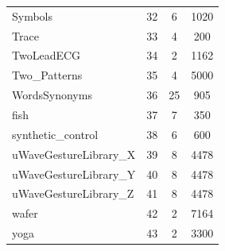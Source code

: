 \documentclass[10pt,journal,compsoc]{IEEEtran}
\begin{document}
\begin{table} [h!]
\begin{center}
\begin{tabular}{lccc}
Symbols & 32 &  6 & 1020 \\ 
Trace & 33 &  4 &  200 \\ 
TwoLeadECG & 34 &  2 & 1162 \\ 
Two\_Patterns & 35 &  4 & 5000 \\ 
WordsSynonyms & 36 & 25 &  905 \\ 
fish & 37 &  7 &  350 \\ 
synthetic\_control & 38 &  6 &  600 \\ 
uWaveGestureLibrary\_X & 39 &  8 & 4478 \\ 
uWaveGestureLibrary\_Y & 40 &  8 & 4478 \\ 
uWaveGestureLibrary\_Z & 41 &  8 & 4478 \\ 
wafer & 42 &  2 & 7164 \\ 
yoga & 43 &  2 & 3300 \\ 
\end{tabular} 
\end{center} 
\end{table} 
 
\end{document}
